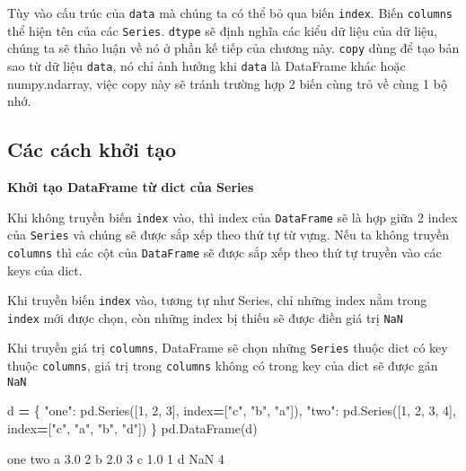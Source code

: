 \documentclass[
]{book}
\newenvironment{Shaded}{\begin{snugshade}}{\end{snugshade}}
\newcommand{\DecValTok}[1]{\textcolor[rgb]{0.00,0.00,0.81}{#1}}
\newcommand{\NormalTok}[1]{#1}
\newcommand{\OperatorTok}[1]{\textcolor[rgb]{0.81,0.36,0.00}{\textbf{#1}}}
\newcommand{\StringTok}[1]{\textcolor[rgb]{0.31,0.60,0.02}{#1}}
\begin{document}
Tùy vào cấu trúc của \texttt{data} mà chúng ta có thể bỏ qua biến \texttt{index}. Biến \texttt{columns} thể hiện tên
của các \texttt{Series}. \texttt{dtype} sẽ định nghĩa các kiểu dữ liệu của dữ liệu, chúng ta sẽ thảo luận về nó
ở phần kế tiếp của chương này. \texttt{copy} dùng để tạo bản sao từ dữ liệu \texttt{data}, nó chỉ ảnh hưởng khi
\texttt{data} là DataFrame khác hoặc numpy.ndarray, việc copy này sẽ tránh trường hợp 2 biến cùng trỏ về
cùng 1 bộ nhớ.

\subsection{Các cách khởi tạo}\label{cuxe1c-cuxe1ch-khux1edfi-tux1ea1o-1}

\textbf{Khởi tạo DataFrame từ dict của Series}

Khi không truyền biến \texttt{index} vào, thì index của \texttt{DataFrame} sẽ là hợp giữa 2 index của \texttt{Series} và
chúng sẽ được sắp xếp theo thứ tự từ vựng. Nếu ta không truyền \texttt{columns} thì các cột của \texttt{DataFrame} sẽ
được sắp xếp theo thứ tự truyền vào các keys của dict.

Khi truyền biến \texttt{index} vào, tương tự như Series, chỉ những index nằm trong \texttt{index} mới được chọn, còn
những index bị thiếu sẽ được điền giá trị \texttt{NaN}

Khi truyền giá trị \texttt{columns}, DataFrame sẽ chọn những \texttt{Series} thuộc dict có key thuộc \texttt{columns}, giá trị
trong \texttt{columns} không có trong key của dict sẽ được gán \texttt{NaN}

\begin{Shaded}
\begin{Highlighting}[]
\NormalTok{d }\OperatorTok{=}\NormalTok{ \{}
            \StringTok{"one"}\NormalTok{: pd.Series([}\DecValTok{1}\NormalTok{, }\DecValTok{2}\NormalTok{, }\DecValTok{3}\NormalTok{], index}\OperatorTok{=}\NormalTok{[}\StringTok{"c"}\NormalTok{, }\StringTok{"b"}\NormalTok{, }\StringTok{"a"}\NormalTok{]),}
            \StringTok{"two"}\NormalTok{: pd.Series([}\DecValTok{1}\NormalTok{, }\DecValTok{2}\NormalTok{, }\DecValTok{3}\NormalTok{, }\DecValTok{4}\NormalTok{], index}\OperatorTok{=}\NormalTok{[}\StringTok{"c"}\NormalTok{, }\StringTok{"a"}\NormalTok{, }\StringTok{"b"}\NormalTok{, }\StringTok{"d"}\NormalTok{])}
\NormalTok{        \}}
\NormalTok{pd.DataFrame(d)}
\end{Highlighting}
\end{Shaded}

\begin{Shaded}
\begin{Highlighting}[]
\NormalTok{   one  two}
\NormalTok{a  3.0    2}
\NormalTok{b  2.0    3}
\NormalTok{c  1.0    1}
\NormalTok{d  NaN    4}
\end{Highlighting}
\end{Shaded}
\end{document}
